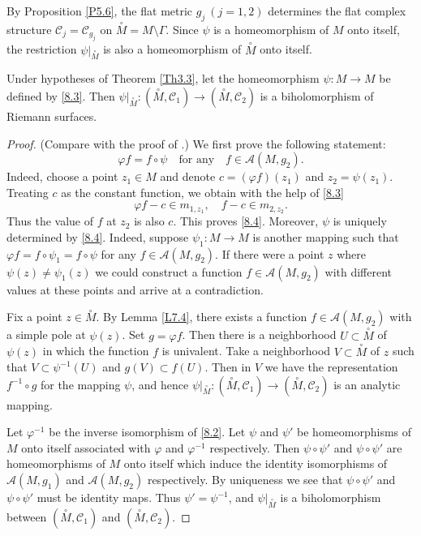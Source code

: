 \documentclass[12pt,reqno]{amsart}
\begin{document}
By Proposition \ref{P5.6}, the flat metric $g_j\ (j=1,2)$ determines the flat complex structure ${\mathcal C}_j={\mathcal C}_{g_j}$ on
$\stackrel\circ M=M\setminus\Gamma$. Since $\psi$ is a homeomorphism of $M$ onto itself, the restriction $\psi|_{\stackrel\circ M}$ is also
a homeomorphism of $\stackrel\circ M$ onto itself.

\begin{lemma} \label{L8.1}
Under hypotheses of Theorem \ref{Th3.3}, let the homeomorphism $\psi:M\to M$ be defined by \eqref{8.3}. Then
$\psi|_{\stackrel\circ M}:(\stackrel\circ M,{\mathcal C}_1)\to(\stackrel\circ M,{\mathcal C}_2)$ is a biholomorphism of Riemann surfaces.
\end{lemma}

\begin{proof} (Compare with the proof of \cite[Theorem 1]{Ro}.)
We first prove the following statement:
\begin{equation}
\varphi f=f\circ\psi\quad\mbox{for any}\quad f\in{\mathcal A}(M,g_2).
                                \label{8.4}
\end{equation}
Indeed, choose a point $z_1\in M$ and denote $c=(\varphi f)(z_1)$ and $z_2=\psi(z_1)$. Treating $c$ as the constant function, we obtain with the help of \eqref{8.3}
$$
\varphi f-c\in m_{1,z_1},\quad f-c\in m_{2,z_2}.
$$
Thus the value of $f$ at $z_2$ is also $c$. This proves \eqref{8.4}. Moreover, $\psi$ is uniquely determined by \eqref{8.4}. Indeed, suppose $\psi_1:M\to M$ is another mapping such that $\varphi f=f\circ\psi_1=f\circ\psi$ for any $f\in{\mathcal A}(M,g_2)$. If there were a point $z$ where $\psi(z)\neq\psi_1(z)$ we could construct a function $f\in{\mathcal A}(M,g_2)$ with different values at these points and arrive at a contradiction.

Fix a point $z\in\stackrel\circ M$. By Lemma \ref{L7.4}, there exists a function $f\in{\mathcal A}(M,g_2)$ with a simple pole at $\psi(z)$. Set $g=\varphi f$. Then there is a neighborhood $U\subset\stackrel\circ M$ of $\psi(z)$ in which the function $f$ is univalent. Take a neighborhood $V\subset\stackrel\circ M$ of $z$ such that $V\subset\psi^{-1}(U)$ and $g(V)\subset f(U)$. Then in $V$ we have the representation $f^{-1}\circ g$ for the mapping $\psi$, and hence $\psi|_{\stackrel\circ M}:(\stackrel\circ M,{\mathcal C}_1)\to(\stackrel\circ M,{\mathcal C}_2)$ is an analytic mapping.

Let $\varphi^{-1}$ be the inverse isomorphism of \eqref{8.2}. Let $\psi$ and $\psi'$ be homeomorphisms of $M$ onto itself associated with $\varphi$ and $\varphi^{-1}$ respectively. Then $\psi\circ\psi'$ and $\psi\circ\psi'$ are homeomorphisms of $M$ onto itself which induce the identity isomorphisms of ${\mathcal A}(M,g_1)$ and ${\mathcal A}(M,g_2)$ respectively. By uniqueness we see that $\psi\circ\psi'$ and $\psi\circ\psi'$ must be identity maps. Thus $\psi'=\psi^{-1}$, and $\psi|_{\stackrel\circ M}$ is a biholomorphism between
$(\stackrel\circ M,{\mathcal C}_1)$ and $(\stackrel\circ M,{\mathcal C}_2)$.
\end{proof}
\end{document}
